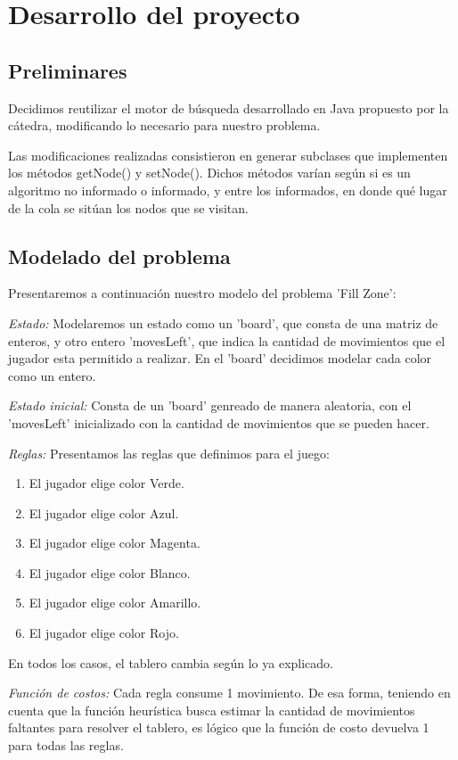 \documentclass{article}
\begin{document}
\section{Desarrollo del proyecto}

\subsection{Preliminares}
Decidimos reutilizar el motor de b\'usqueda desarrollado en Java propuesto por la c\'atedra, modificando lo necesario para nuestro problema.

Las modificaciones realizadas consistieron en generar subclases que implementen los m\'etodos getNode() y setNode(). Dichos m\'etodos var\'ian seg\'un si es un algoritmo no informado o informado, y entre los informados, en donde qu\'e lugar de la cola se sit\'uan los nodos que se visitan.

\subsection{Modelado del problema}
Presentaremos a continuaci\'on nuestro modelo del problema 'Fill Zone':

\emph{Estado:} Modelaremos un estado como un 'board', que consta de una matriz de enteros, y otro entero 'movesLeft', que indica la cantidad de movimientos que el jugador esta permitido a realizar.
En el 'board' decidimos modelar cada color como un entero.

\emph{Estado inicial:} Consta de un 'board' genreado de manera aleatoria, con el 'movesLeft' inicializado con la cantidad de movimientos que se pueden hacer.

\emph{Reglas:} Presentamos las reglas que definimos para el juego:
\begin{enumerate}
	\item El jugador elige color Verde.
	\item El jugador elige color Azul.
	\item El jugador elige color Magenta.
	\item El jugador elige color Blanco.
	\item El jugador elige color Amarillo.
	\item El jugador elige color Rojo.
\end{enumerate}

En todos los casos, el tablero cambia seg\'un lo ya explicado.

\emph{Funci\'on de costos:} Cada regla consume 1 movimiento. De esa forma, teniendo en cuenta que la funci\'on heur\'istica busca estimar la cantidad de movimientos faltantes para resolver el tablero, es l\'ogico que la funci\'on de costo devuelva 1 para todas las reglas.
\end{document}
